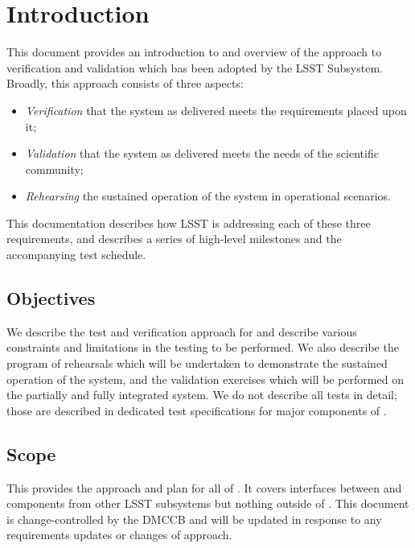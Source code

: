 \section{Introduction \label{sect:intro}}

This document provides an introduction to and overview of the approach to verification and validation which bas been adopted by the LSST \product{} Subsystem.
Broadly, this approach consists of three aspects:

\begin{itemize}

  \item{\emph{Verification} that the \product{} system as delivered meets the requirements placed upon it;}
  \item{\emph{Validation} that the system as delivered meets the needs of the scientific community;}
  \item{\emph{Rehearsing} the sustained operation of the system in operational scenarios.}

\end{itemize}

This documentation describes how LSST \product{} is addressing each of these three requirements, and describes a series of high-level milestones and the accompanying test schedule.

\subsection{Objectives \label{sect:objectives}}

We describe the test and verification approach for \product{} and describe various constraints and limitations in the testing to be performed.
We also describe the program of rehearsals which will be undertaken to demonstrate the sustained operation of the \product{} system, and the validation exercises which will be performed on the partially and fully integrated system.
We do not describe all tests in detail; those are described in dedicated test specifications for major components of \product{}.

\subsection{Scope \label{sect:scope}}

This provides the approach and plan for all of \product{}.
It covers interfaces between \product{} and components from other LSST subsystems but nothing outside of \product{}.
This document is change-controlled by the DMCCB and will be updated in response to any requirements updates or changes of approach.

